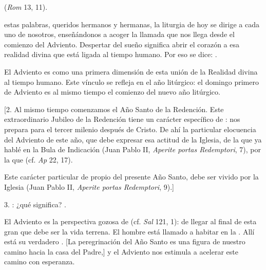 \begin{body}
	 (\emph{Rom} 13, 11). 
	
	 estas palabras, queridos hermanos y hermanas, la liturgia de hoy se dirige a cada uno de nosotros, enseñándonos a acoger la llamada que nos llega desde el comienzo del Adviento. Despertar del sueño significa abrir el corazón a esa realidad divina que está ligada al tiempo humano. Por eso se dice: . 
	
	El Adviento es como una primera dimensión de esta unión de la Realidad divina al tiempo humano. Este vínculo se refleja en el año litúrgico: el domingo primero de Adviento es al mismo tiempo el comienzo del nuevo año litúrgico. 
	
	{[}2. Al mismo tiempo comenzamos el Año Santo de la Redención. Este extraordinario Jubileo de la Redención tiene un carácter específico de : nos prepara para el tercer milenio después de Cristo. De ahí la particular elocuencia del Adviento de este año, que debe expresar esa actitud de la Iglesia, de la que ya hablé en la Bula de Indicación (Juan Pablo II, \emph{Aperite portas Redemptori}, 7), por la que  (cf. \emph{Ap} 22, 17). 
	
	Este carácter particular de  propio del presente Año Santo, debe ser vivido por la Iglesia  (Juan Pablo II, \emph{Aperite portas Redemptori}, 9).{]} 
	
	3. : ¿qué significa? . 
	
	El Adviento es la perspectiva gozosa de  (cf. \emph{Sal} 121, 1): de llegar al final de esta gran  que debe ser la vida terrena. El hombre está llamado a habitar en la . Allí está su verdadero . {[}La peregrinación del Año Santo es una figura de nuestro camino hacia la casa del Padre,{]} y el Adviento nos estimula a acelerar este camino con esperanza. 
	

\end{body}
